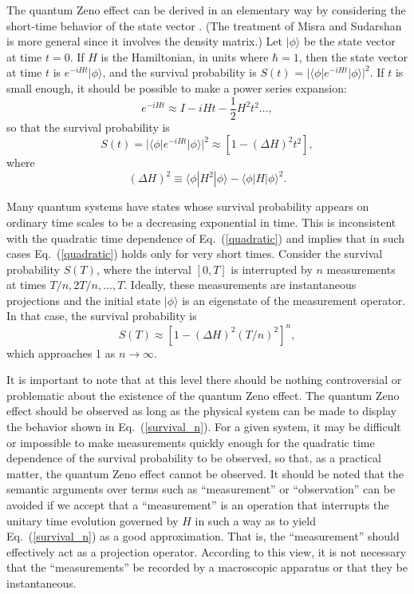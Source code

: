 \documentclass[12pt]{article}
\begin{document}
The quantum Zeno effect can be derived in an elementary way by
considering the short-time behavior of the state vector
\cite{peres80}.  (The treatment of Misra and Sudarshan
\cite{misra77} is more general since it involves the density
matrix.) Let $|\phi\rangle$ be the state vector at time $t=0$. If
$H$ is the Hamiltonian, in units where $\hbar=1$, then the state
vector at time $t$ is $e^{-iHt}|\phi\rangle$, and the survival
probability is $S(t)$ = $|\langle \phi|e^{-iHt}|\phi\rangle|^2$. If
$t$ is small enough, it should be possible to make a power series
expansion:
\begin{equation}
e^{-iHt} \approx  I -iHt -\frac{1}{2} H^2 t^2
\ldots,\label{quadratic}
\end{equation}
so that the survival probability is
\begin{equation}
S(t) = |\langle \phi|e^{-iHt}|\phi\rangle|^2 \approx [1-(\Delta
H)^2t^2],
\end{equation}
 where
\begin{equation}
(\Delta H)^2 \equiv \langle\phi|H^2|\phi\rangle -
\langle\phi|H|\phi\rangle^2.
\end{equation}

Many quantum systems have states whose survival probability appears
on ordinary time scales to be a decreasing exponential in time. This
is inconsistent with the quadratic time dependence of
Eq.~(\ref{quadratic}) and implies that in such cases
Eq.~(\ref{quadratic}) holds only for very short times. Consider the
survival probability $S(T)$, where the interval $[0,T]$ is
interrupted by $n$ measurements at times $T/n, 2T/n,\ldots,T$.
Ideally, these measurements are instantaneous projections and the
initial state $|\phi\rangle$ is an eigenstate of the measurement
operator. In that case, the survival probability is
\begin{equation}
S(T) \approx [1-(\Delta H)^2(T/n)^2]^n, \label{survival_n}
\end{equation}
which approaches 1 as $n\rightarrow \infty$.

It is important to note that at this level there should be nothing
controversial or problematic about the existence of the quantum Zeno
effect. The quantum Zeno effect should be observed as long as the
physical system can be made to display the behavior shown in
Eq.~(\ref{survival_n}). For a given system, it may be difficult or
impossible to make measurements quickly enough for the quadratic
time dependence of the survival probability to be observed, so that,
as a practical matter, the quantum Zeno effect cannot be observed.
It should be noted that the semantic arguments over terms such as
``measurement'' or ``observation'' can be avoided if we accept that
a ``measurement'' is an operation that interrupts the unitary time
evolution governed by $H$ in such a way as to yield
Eq.~(\ref{survival_n}) as a good approximation. That is, the
``measurement'' should effectively act as a projection operator.
According to this view, it is not necessary that the
``measurements'' be recorded by a macroscopic apparatus or that they
be instantaneous.
\end{document}
